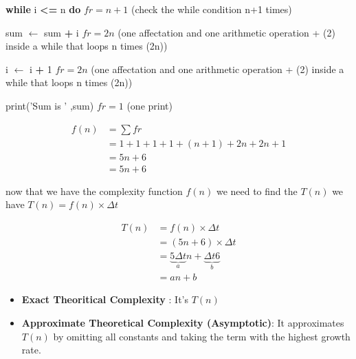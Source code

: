\vspace{0.15cm}

\textbf{while} i \textcolor{redPlot}{\textbf{\textless=}} n  \textbf{do} \hspace{2.75cm} \(fr = n+1\) (check the while condition n+1 times)

\vspace{0.15cm}
sum $\gets$ sum \textcolor{redPlot}{ \textbf{+}} i \hspace{3cm} \(fr = 2n\) (one affectation and one arithmetic operation + (2) inside a while that loops n times (2n))

\vspace{0.15cm}
i $\gets$ i \textcolor{redPlot}{ \textbf{+}} 1 \hspace{4cm} \(fr = 2n\) (one affectation and one arithmetic operation + (2) inside a while that loops n times (2n))

\vspace{0.15cm}

\textcolor{purplePlot!80!black}{print}(\textcolor{blueArea!60!black}{'Sum is ' },{sum}) \hspace{2.25cm} \(fr = 1\) (one print)

\vspace{0.75cm}
\begin{align*}
f(n) &= \sum fr \\
     &= 1 + 1 + 1 + 1 + (n+1) + 2n + 2n + 1 \\
     &= 5n + 6 \\
     &= \boxed{5n + 6}
\end{align*}

\vspace{0.5cm}
now that we have the complexity function \(f(n)\) we need to find the \(T(n)\)  we have \(T(n) = f(n) \times \Delta t\)

\begin{align*}
T(n) &= f(n) \times \Delta t\\ 
&= (5n + 6) \times \Delta t \\
&= \underbrace{5 \Delta t}_{a} n + \underbrace{\Delta t 6}_{b} \\
&= \boxed{an+b} 
\end{align*}

\vspace{0.35cm}

\begin{tcolorbox}[enhanced, colback=white!90!greenPlot, colframe=greenPlot!60!black, coltitle=white, fonttitle=\bfseries\Large, title=Note, boxrule=1mm, arc=0.5mm, drop shadow=greenPlot!35!gray]
\begin{itemize}
    \item \textbf{Exact Theoritical Complexity} : It's \(T(n)\)
    \item \textbf{Approximate Theoretical Complexity (Asymptotic)}: 
It approximates \(T(n)\) by omitting all constants and taking the term with the highest growth rate.
\end{itemize}
\end{tcolorbox}


